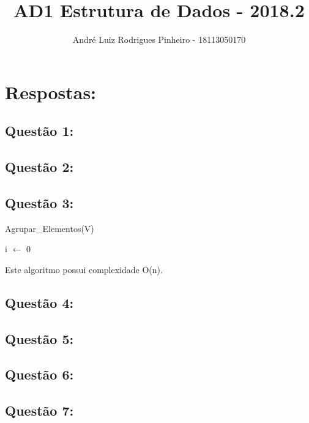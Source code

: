 \documentclass[a4paper,11pt]{article}
\title{AD1 Estrutura de Dados - 2018.2}
\author{André Luiz Rodrigues Pinheiro - 18113050170}
\begin{document}
\maketitle

\section*{Respostas:}

\subsection*{Questão 1:}

\subsection*{Questão 2:}

\subsection*{Questão 3:}

\begin{algorithm}
\caption{Agrupar\_Elementos(V)}
i $\leftarrow$ 0\\
\end{algorithm}

Este algoritmo possui complexidade O(n).

\subsection*{Questão 4:}

\subsection*{Questão 5:}

\subsection*{Questão 6:}

\subsection*{Questão 7:}
\end{document}
